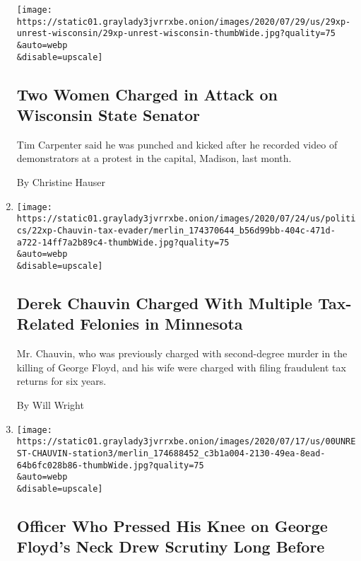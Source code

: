 \begin{enumerate}
  \texttt{[image: https://static01.graylady3jvrrxbe.onion/images/2020/07/29/us/29xp-unrest-wisconsin/29xp-unrest-wisconsin-thumbWide.jpg?quality=75\\\&auto=webp\\\&disable=upscale]}

  \hypertarget{two-women-charged-in-attack-on-wisconsin-state-senator}{%
  \subsection{Two Women Charged in Attack on Wisconsin State
  Senator}\label{two-women-charged-in-attack-on-wisconsin-state-senator}}

  Tim Carpenter said he was punched and kicked after he recorded video
  of demonstrators at a protest in the capital, Madison, last month.

  By Christine Hauser
\item
  \href{/2020/07/22/us/derek-chauvin-tax-fraud.html}{}

  \texttt{[image: https://static01.graylady3jvrrxbe.onion/images/2020/07/24/us/politics/22xp-Chauvin-tax-evader/merlin\_174370644\_b56d99bb-404c-471d-a722-14ff7a2b89c4-thumbWide.jpg?quality=75\\\&auto=webp\\\&disable=upscale]}

  \hypertarget{derek-chauvin-charged-with-multiple-tax-related-felonies-in-minnesota}{%
  \subsection{Derek Chauvin Charged With Multiple Tax-Related Felonies
  in
  Minnesota}\label{derek-chauvin-charged-with-multiple-tax-related-felonies-in-minnesota}}

  Mr. Chauvin, who was previously charged with second-degree murder in
  the killing of George Floyd, and his wife were charged with filing
  fraudulent tax returns for six years.

  By Will Wright
\item
  \href{/2020/07/18/us/derek-chauvin-george-floyd.html}{}

  \texttt{[image: https://static01.graylady3jvrrxbe.onion/images/2020/07/17/us/00UNREST-CHAUVIN-station3/merlin\_174688452\_c3b1a004-2130-49ea-8ead-64b6fc028b86-thumbWide.jpg?quality=75\\\&auto=webp\\\&disable=upscale]}

  \hypertarget{officer-who-pressed-his-knee-on-george-floyds-neck-drew-scrutiny-long-before}{%
  \subsection{Officer Who Pressed His Knee on George Floyd's Neck Drew
  Scrutiny Long
  Before}\label{officer-who-pressed-his-knee-on-george-floyds-neck-drew-scrutiny-long-before}}


\end{enumerate}

